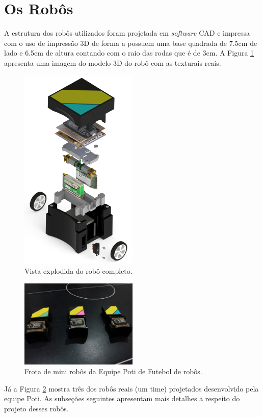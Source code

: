 \section{Os Robôs}
A estrutura dos robôs utilizados foram projetada em \emph{software} CAD e impressa com o uso de impressão 3D de forma a possuem uma base quadrada de 7.5cm de lado e 6.5cm de altura contando com o raio das rodas que é de 3cm. A Figura \ref{fig:robo_completo_explodido} apresenta uma imagem do modelo 3D do robô com as texturais reais.\\

\begin{figure}[H]
    \centering
    \includegraphics[width=0.5\textwidth]{figuras/robo/robo_completo_explodido.png}
    \caption{Vista explodida do robô completo.}
    \label{fig:robo_completo_explodido}
\end{figure}

\begin{figure}[H]
    \centering
    \includegraphics[width=0.5\textwidth]{figuras/robo/robos_capa_aberta.jpg}
    \caption{Frota de mini robôs da Equipe Poti de Futebol de robôs.}
    \label{fig:robos_capa_aberta}
\end{figure}

Já a Figura \ref{fig:robos_capa_aberta} mostra três dos robôs reais (um time) projetados desenvolvido pela equipe Poti. As subseções seguintes apresentam mais detalhes a respeito do projeto desses robôs.


